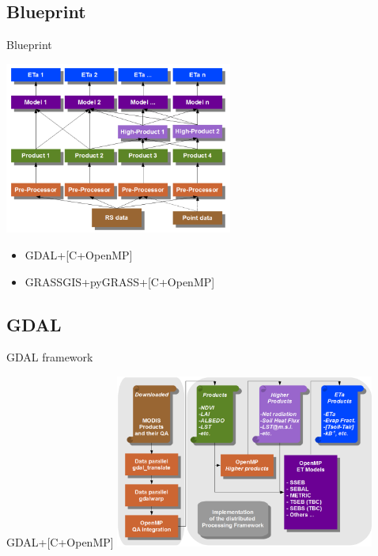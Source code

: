 \documentclass[xcolor=dvipsnames,beamer]{beamer} %
\begin{document}
\subsection{Blueprint}
\begin{frame}[fragile]{Blueprint}

\begin{center}
 \includegraphics[width=7.5cm]{chain0}
\end{center}

\begin{itemize}
 \item GDAL+[C+OpenMP]
 \item GRASSGIS+pyGRASS+[C+OpenMP]
\end{itemize}
\end{frame}

\subsection{GDAL}
\begin{frame}[fragile]{GDAL framework}

\begin{center}
 GDAL+[C+OpenMP]
 \includegraphics[width=8.5cm]{chain2}
\end{center}
\end{frame}
\end{document}
